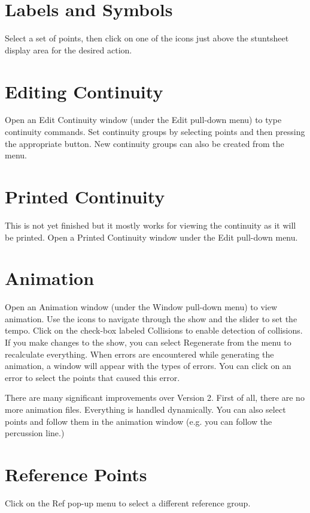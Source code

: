 \section{Labels and Symbols}\label{symbols}

Select a set of points, then click on one of the icons just above the
stuntsheet display area for the desired action.

\section{Editing Continuity}\label{editcont}

Open an Edit Continuity window (under the Edit pull-down menu) to type
continuity commands.  Set continuity groups by selecting points and then
pressing the appropriate button.  New continuity groups can also be
created from the menu.

\section{Printed Continuity}\label{printcont}

This is not yet finished but it mostly works for viewing the continuity
as it will be printed.  Open a Printed Continuity window under the Edit
pull-down menu.

\section{Animation}\label{animwin}

Open an Animation window (under the Window pull-down menu) to view animation.
Use the icons to navigate through the show and the slider to set the tempo.
Click on the check-box labeled Collisions to enable detection of collisions.
If you make changes to the show, you can select Regenerate from the menu
to recalculate everything.  When errors are encountered while generating
the animation, a window will appear with the types of errors.  You can
click on an error to select the points that caused this error.

There are many significant improvements over Version 2.  First of all,
there are no more animation files.  Everything is handled dynamically.
You can also select points and follow them in the animation window
(e.g. you can follow the percussion line.)

\section{Reference Points}\label{refpoints}

Click on the Ref pop-up menu to select a different reference group.
